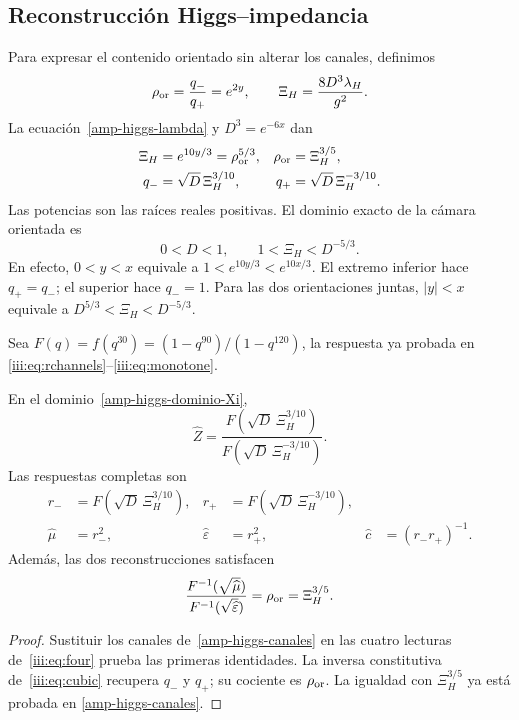 \subsection{Reconstrucción Higgs--impedancia}

Para expresar el contenido orientado sin alterar los canales,
definimos
\begin{equation}
 \rho_{\rm or}=\frac{q_-}{q_+}=e^{2y},\qquad
 \Xi_H=\frac{8D^3\lambda_H}{g^2}.
 \label{amp-higgs-Xi}
\end{equation}
La ecuación~\eqref{amp-higgs-lambda} y $D^3=e^{-6x}$ dan
\begin{equation}
 \begin{aligned}
 \Xi_H&=e^{10y/3}=\rho_{\rm or}^{5/3},&
 \rho_{\rm or}&=\Xi_H^{3/5},\\
 q_-&=\sqrt D\,\Xi_H^{3/10},&
 q_+&=\sqrt D\,\Xi_H^{-3/10}.
 \end{aligned}
 \label{amp-higgs-canales}
\end{equation}
Las potencias son las raíces reales positivas. El dominio exacto
de la cámara orientada es
\begin{equation}
 0<D<1,\qquad 1<\Xi_H<D^{-5/3}.
 \label{amp-higgs-dominio-Xi}
\end{equation}
En efecto, $0<y<x$ equivale a $1<e^{10y/3}<e^{10x/3}$.
El extremo inferior hace $q_+=q_-$; el superior hace $q_-=1$.
Para las dos orientaciones juntas, $|y|<x$ equivale a
$D^{5/3}<\Xi_H<D^{-5/3}$.

Sea $F(q)=f(q^{30})=(1-q^{90})/(1-q^{120})$, la respuesta ya probada en
\eqref{iii:eq:rchannels}--\eqref{iii:eq:monotone}.
\begin{corollary}
\label{amp-higgs-impedancia-corolario}
En el dominio~\eqref{amp-higgs-dominio-Xi},
\begin{equation}
 \boxed{\widehat Z=
 \frac{F(\sqrt D\,\Xi_H^{3/10})}
 {F(\sqrt D\,\Xi_H^{-3/10})}.}
 \label{amp-higgs-impedancia}
\end{equation}
Las respuestas completas son
\begin{equation}
 \begin{aligned}
 r_-&=F(\sqrt D\,\Xi_H^{3/10}),&
 r_+&=F(\sqrt D\,\Xi_H^{-3/10}),\\
 \widehat\mu&=r_-^2,& \widehat\varepsilon&=r_+^2,&
 \widehat c&=(r_-r_+)^{-1}.
 \end{aligned}
 \label{amp-higgs-vacio}
\end{equation}
Además, las dos reconstrucciones satisfacen
\begin{equation}
 \frac{F^{-1}(\sqrt{\widehat\mu})}
 {F^{-1}(\sqrt{\widehat\varepsilon})}
 =\rho_{\rm or}=\Xi_H^{3/5}.
 \label{amp-higgs-confluencia}
\end{equation}
\end{corollary}
\begin{proof}
Sustituir los canales de~\eqref{amp-higgs-canales} en las cuatro lecturas
de~\eqref{iii:eq:four} prueba las primeras identidades. La inversa
constitutiva de~\eqref{iii:eq:cubic} recupera $q_-$ y $q_+$; su cociente
es $\rho_{\rm or}$. La igualdad con $\Xi_H^{3/5}$ ya está probada en
\eqref{amp-higgs-canales}.
\end{proof}


